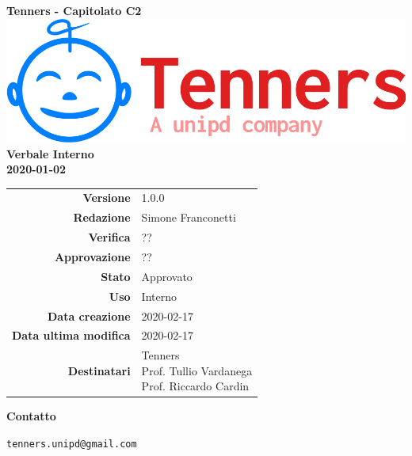 \begin{titlepage}
	\begin{center}
		\large \textbf{Tenners - Capitolato C2}
		\vfill
		\includegraphics[scale = 0.3]{./res/img/logo.png}\\
		\vfill
		\Huge \textbf{Verbale Interno} \\
		\textbf {2020-01-02}

        \vfill
        \large

        \begin{tabular}{r|l}
                        \textbf{Versione} & 1.0.0 \\
                        \textbf{Redazione} & Simone Franconetti \\
                        \textbf{Verifica} &  ?? \\
                        \textbf{Approvazione} & ?? \\
                        \textbf{Stato} & Approvato \\
                        \textbf{Uso} &  Interno\\
                        \textbf{Data creazione} &  2020-02-17\\
                        \textbf{Data ultima modifica} &  2020-02-17\\
                        \textbf{Destinatari} & \parbox[t]{5cm}{Tenners \\ Prof. Tullio Vardanega\\ Prof. Riccardo Cardin}
                \end{tabular}
                \vfill
                \normalsize
                \vfill
                \textbf{Contatto}

                \texttt{tenners.unipd@gmail.com}

	\end{center}
\end{titlepage}